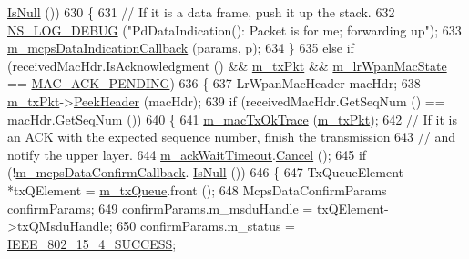 \begin{DoxyCode}
      \hyperlink{classns3_1_1Callback_aa8e27826badbf37f84763f36f70d9b54}{IsNull} ())
630                 \{
631                   \textcolor{comment}{// If it is a data frame, push it up the stack.}
632                   \hyperlink{group__logging_ga413f1886406d49f59a6a0a89b77b4d0a}{NS\_LOG\_DEBUG} (\textcolor{stringliteral}{"PdDataIndication():  Packet is for me; forwarding up"});
633                   \hyperlink{classns3_1_1LrWpanMac_ada2124716389b849b2a1f9c8ff64d597}{m\_mcpsDataIndicationCallback} (params, p);
634                 \}
635               \textcolor{keywordflow}{else} \textcolor{keywordflow}{if} (receivedMacHdr.IsAcknowledgment () && \hyperlink{classns3_1_1LrWpanMac_aca93e7c7a2128818f2861a48751442ca}{m\_txPkt} && 
      \hyperlink{classns3_1_1LrWpanMac_ab5cdfd39de7397d658d300961dab3ed0}{m\_lrWpanMacState} == \hyperlink{group__lr-wpan_gga02ee7efd682937a8781f5e6101f61884ae46a1e995082569f76cb986500770ab8}{MAC\_ACK\_PENDING})
636                 \{
637                   LrWpanMacHeader macHdr;
638                   \hyperlink{classns3_1_1LrWpanMac_aca93e7c7a2128818f2861a48751442ca}{m\_txPkt}->\hyperlink{classns3_1_1Packet_aadc63487bea70945c418f4c3e9b81964}{PeekHeader} (macHdr);
639                   \textcolor{keywordflow}{if} (receivedMacHdr.GetSeqNum () == macHdr.GetSeqNum ())
640                     \{
641                       \hyperlink{classns3_1_1LrWpanMac_a0f0ba6655bd6aba1bac028bd25f4ab7a}{m\_macTxOkTrace} (\hyperlink{classns3_1_1LrWpanMac_aca93e7c7a2128818f2861a48751442ca}{m\_txPkt});
642                       \textcolor{comment}{// If it is an ACK with the expected sequence number, finish the transmission}
643                       \textcolor{comment}{// and notify the upper layer.}
644                       \hyperlink{classns3_1_1LrWpanMac_aab5862bb53367634f12d0cddecc19fa8}{m\_ackWaitTimeout}.\hyperlink{classns3_1_1EventId_a993ae94e48e014e1afd47edb16db7a11}{Cancel} ();
645                       \textcolor{keywordflow}{if} (!\hyperlink{classns3_1_1LrWpanMac_a05eba7a98d1cbbf86151290069e093e0}{m\_mcpsDataConfirmCallback}.
      \hyperlink{classns3_1_1Callback_aa8e27826badbf37f84763f36f70d9b54}{IsNull} ())
646                         \{
647                           TxQueueElement *txQElement = \hyperlink{classns3_1_1LrWpanMac_a90ea1fb2b1cec84e8ca2177772a1644d}{m\_txQueue}.front ();
648                           McpsDataConfirmParams confirmParams;
649                           confirmParams.m\_msduHandle = txQElement->txQMsduHandle;
650                           confirmParams.m\_status = \hyperlink{group__lr-wpan_gga50d67c8816b2ca8da8df30d045b1b705a9fcca1742a3f5fd112aab55e786a0124}{IEEE\_802\_15\_4\_SUCCESS};

\end{DoxyCode}
